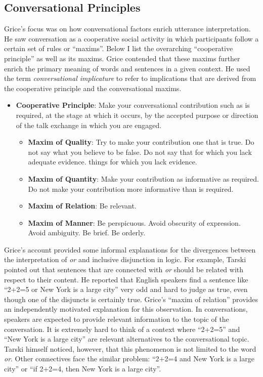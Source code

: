 \documentclass[oneside]{report}
\theoremstyle{definition}
\theoremstyle{definition}
\theoremstyle{definition}
\theoremstyle{remark}
\begin{document}
\subsection{Conversational Principles}\label{conversational-principles}

Grice's focus was on how conversational factors enrich utterance
interpretation. He saw conversation as a cooperative social activity in
which participants follow a certain set of rules or ``maxims''. Below I
list the overarching ``cooperative principle'' as well as its maxims.
Grice contended that these maxims further enrich the primary meaning of
words and sentences in a given context. He used the term
\emph{conversational implicature} to refer to implications that are
derived from the cooperative principle and the conversational maxims.
\begin{itemize}
\tightlist
\item
  \textbf{Cooperative Principle}: Make your conversational contribution
  such as is required, at the stage at which it occurs, by the accepted
  purpose or direction of the talk exchange in which you are engaged.
  \begin{itemize}
  \tightlist
  \item
    \textbf{Maxim of Quality}: Try to make your contribution one that is
    true. Do not say what you believe to be false. Do not say that for
    which you lack adequate evidence. things for which you lack
    evidence.
  \item
    \textbf{Maxim of Quantity}: Make your contribution as informative as
    required. Do not make your contribution more informative than is
    required.
  \item
    \textbf{Maxim of Relation}: Be relevant.
  \item
    \textbf{Maxim of Manner}: Be perspicuous. Avoid obscurity of
    expression. Avoid ambiguity. Be brief. Be orderly.
  \end{itemize}
\end{itemize}
Grice's account provided some informal explanations for the divergences
between the interpretation of \emph{or} and inclusive disjunction in
logic. For example, Tarski pointed out that sentences that are connected
with \emph{or} should be related with respect to their content. He
reported that English speakers find a sentence like ``2+2=5 or New York
is a large city'' very odd and hard to judge as true, even though one of
the disjuncts is certainly true. Grice's ``maxim of relation'' provides
an independently motivated explanation for this observation. In
conversations, speakers are expected to provide relevant information to
the topic of the conversation. It is extremely hard to think of a
context where ``2+2=5'' and ``New York is a large city'' are relevant
alternatives to the conversational topic. Tarski himself noticed,
however, that this phenomenon is not limited to the word \emph{or}.
Other connectives face the similar problem: ``2+2=4 and New York is a
large city'' or ``if 2+2=4, then New York is a large city''.
\end{document}
